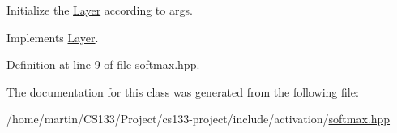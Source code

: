 Initialize the \hyperlink{class_layer}{Layer} according to args. 



Implements \hyperlink{class_layer_aab662b9c8e61cd7375cbb4413d2e3037}{Layer}.



Definition at line 9 of file softmax.\+hpp.



The documentation for this class was generated from the following file\+:\begin{DoxyCompactItemize}
\item 
/home/martin/\+C\+S133/\+Project/cs133-\/project/include/activation/\hyperlink{_softmax_8hpp}{softmax.\+hpp}\end{DoxyCompactItemize}
